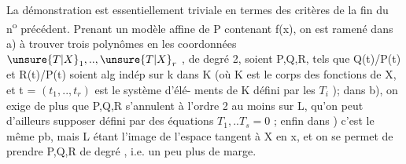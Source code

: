 La démonstration est essentiellement triviale en termes des
critères de la fin du n\textsuperscript{o} précédent. Prenant un modèle affine de P
contenant f(x), on est ramené dans a) à trouver  trois polynômes
en les coordonnées $\unsure{T|X}_1,..,\unsure{T|X}_r$ , de degré 2, soient P,Q,R, tels que
Q(t)/P(t) et R(t)/P(t) soient alg indép sur k dans K (où K est le
corps des fonctions de X, et t = $(t_1,..,t_r)$ est le système d'élé-%
ments de K défini par les $T_i$ ); dans b), on exige de plus que P,Q,R
s'annulent à l'ordre 2 au moins sur L, qu'on peut d'ailleurs supposer
défini par des équations $T_1,..T_s = 0$ ; enfin dans ) c'est le même
pb, mais L étant l'image de l'espace tangent à X en x, et on se permet
 de prendre P,Q,R  de degré  , i.e. un peu plus de marge.

